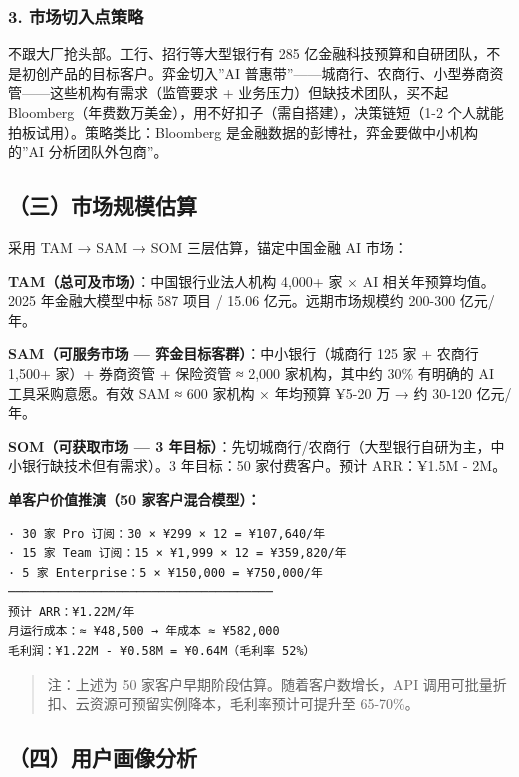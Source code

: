 \documentclass[
]{ctexart}
\begin{document}
\subsubsection{3.
市场切入点策略}\label{ux5e02ux573aux5207ux5165ux70b9ux7b56ux7565}

不跟大厂抢头部。工行、招行等大型银行有 285
亿金融科技预算和自研团队，不是初创产品的目标客户。弈金切入''AI
普惠带''------城商行、农商行、小型券商资管------这些机构有需求（监管要求
+ 业务压力）但缺技术团队，买不起
Bloomberg（年费数万美金），用不好扣子（需自搭建），决策链短（1-2
个人就能拍板试用）。策略类比：Bloomberg
是金融数据的彭博社，弈金要做中小机构的''AI 分析团队外包商''。

\subsection{（三）市场规模估算}\label{ux4e09ux5e02ux573aux89c4ux6a21ux4f30ux7b97}

采用 TAM → SAM → SOM 三层估算，锚定中国金融 AI 市场：

\textbf{TAM（总可及市场）}：中国银行业法人机构 4,000+ 家 × AI
相关年预算均值。2025 年金融大模型中标 587 项目 / 15.06
亿元。远期市场规模约 200-300 亿元/年。

\textbf{SAM（可服务市场 --- 弈金目标客群）}：中小银行（城商行 125 家 +
农商行 1,500+ 家）+ 券商资管 + 保险资管 ≈ 2,000 家机构，其中约 30\%
有明确的 AI 工具采购意愿。有效 SAM ≈ 600 家机构 × 年均预算 ¥5-20 万 → 约
30-120 亿元/年。

\textbf{SOM（可获取市场 --- 3
年目标）}：先切城商行/农商行（大型银行自研为主，中小银行缺技术但有需求）。3
年目标：50 家付费客户。预计 ARR：¥1.5M - 2M。

\textbf{单客户价值推演（50 家客户混合模型）：}

\begin{verbatim}
· 30 家 Pro 订阅：30 × ¥299 × 12 = ¥107,640/年
· 15 家 Team 订阅：15 × ¥1,999 × 12 = ¥359,820/年
· 5 家 Enterprise：5 × ¥150,000 = ¥750,000/年
─────────────────────────────────────
预计 ARR：¥1.22M/年
月运行成本：≈ ¥48,500 → 年成本 ≈ ¥582,000
毛利润：¥1.22M - ¥0.58M = ¥0.64M（毛利率 52%）
\end{verbatim}

\begin{quote}
注：上述为 50 家客户早期阶段估算。随着客户数增长，API
调用可批量折扣、云资源可预留实例降本，毛利率预计可提升至 65-70\%。
\end{quote}

\subsection{（四）用户画像分析}\label{ux56dbux7528ux6237ux753bux50cfux5206ux6790}
\end{document}
